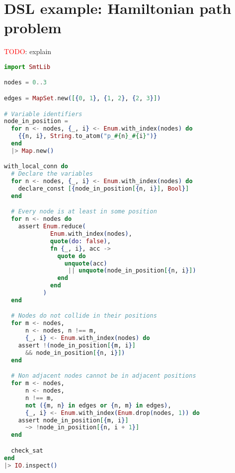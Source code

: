 \chapter{DSL example: Hamiltonian path problem}
\label{Appendix:hamiltonian}

\textcolor{red}{TODO}: explain

\begin{lstlisting}[language=elixir,numbers=none,frame=none]
import SmtLib

nodes = 0..3

edges = MapSet.new([{0, 1}, {1, 2}, {2, 3}])

# Variable identifiers
node_in_position =
  for n <- nodes, {_, i} <- Enum.with_index(nodes) do
    {{n, i}, String.to_atom("p_#{n}_#{i}")}
  end
  |> Map.new()

with_local_conn do
  # Declare the variables
  for n <- nodes, {_, i} <- Enum.with_index(nodes) do
    declare_const [{node_in_position[{n, i}], Bool}]
  end

  # Every node is at least in some position
  for n <- nodes do
    assert Enum.reduce(
             Enum.with_index(nodes),
             quote(do: false),
             fn {_, i}, acc ->
               quote do
                 unquote(acc) 
                  || unquote(node_in_position[{n, i}])
               end
             end
           )
  end

  # Nodes do not collide in their positions
  for m <- nodes, 
      n <- nodes, n !== m, 
      {_, i} <- Enum.with_index(nodes) do
    assert !(node_in_position[{m, i}] 
      && node_in_position[{n, i}])
  end

  # Non adjacent nodes cannot be in adjacent positions
  for m <- nodes,
      n <- nodes,
      n !== m,
      not ({m, n} in edges or {n, m} in edges),
      {_, i} <- Enum.with_index(Enum.drop(nodes, 1)) do
    assert node_in_position[{m, i}] 
      ~> !node_in_position[{n, i + 1}]
  end

  check_sat
end
|> IO.inspect()
\end{lstlisting}
